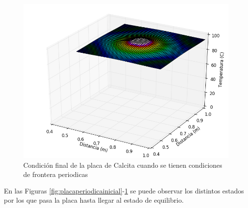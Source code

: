 \documentclass[]{article}
\begin{document}
\begin{figure}[H]
    \centering
    \includegraphics[width=\linewidth]{placaperiodicafinal.png}
    \caption{Condición final de la placa de Calcita cuando se tienen condiciones de frontera periodicas}
    \label{fig:placaperiodicafinal}
\end{figure}

En las Figuras \ref{fig:placaperiodicainicial}-\ref{fig:placaperiodicafinal} se puede observar los distintos estados por los que pasa la placa hasta llegar al estado de equilibrio.
\end{document}
